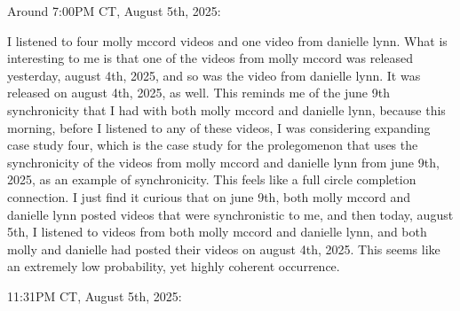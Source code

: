 \documentclass{article}
\begin{document}
Around 7:00PM CT, August 5th, 2025:

I listened to four molly mccord videos and one video from danielle lynn.
What is interesting to me is that one of the videos from molly mccord
was released yesterday, august 4th, 2025, and so was the video from
danielle lynn. It was released on august 4th, 2025, as well. This
reminds me of the june 9th synchronicity that I had with both molly
mccord and danielle lynn, because this morning, before I listened to any
of these videos, I was considering expanding case study four, which is
the case study for the prolegomenon that uses the synchronicity of the
videos from molly mccord and danielle lynn from june 9th, 2025, as an
example of synchronicity. This feels like a full circle completion
connection. I just find it curious that on june 9th, both molly mccord
and danielle lynn posted videos that were synchronistic to me, and then
today, august 5th, I listened to videos from both molly mccord and
danielle lynn, and both molly and danielle had posted their videos on
august 4th, 2025. This seems like an extremely low probability, yet
highly coherent occurrence.

11:31PM CT, August 5th, 2025:
\end{document}
